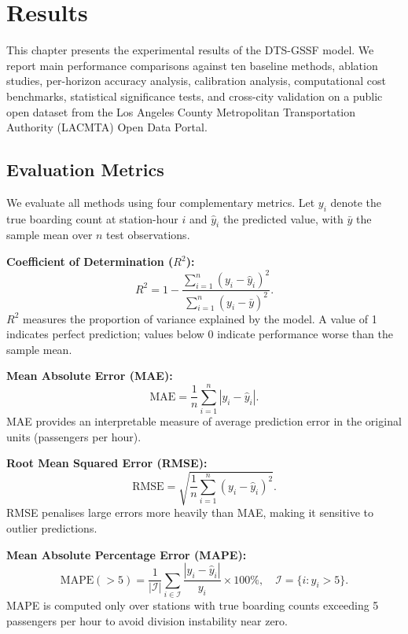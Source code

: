%
%
\chapter{Results}
\label{chap:results}
\setlength{\parskip}{1em}

This chapter presents the experimental results of the DTS-GSSF model. We report main performance comparisons against ten baseline methods, ablation studies, per-horizon accuracy analysis, calibration analysis, computational cost benchmarks, statistical significance tests, and cross-city validation on a public open dataset from the Los Angeles County Metropolitan Transportation Authority (LACMTA) Open Data Portal.

\section{Evaluation Metrics}
\label{sec:metrics}

We evaluate all methods using four complementary metrics. Let $y_i$ denote the true boarding count at station-hour $i$ and $\hat{y}_i$ the predicted value, with $\bar{y}$ the sample mean over $n$ test observations.

\textbf{Coefficient of Determination ($R^2$):}
\begin{equation}
    R^2 = 1 - \frac{\sum_{i=1}^{n}(y_i - \hat{y}_i)^2}{\sum_{i=1}^{n}(y_i - \bar{y})^2}.
    \label{eq:r2}
\end{equation}
$R^2$ measures the proportion of variance explained by the model. A value of 1 indicates perfect prediction; values below 0 indicate performance worse than the sample mean.

\textbf{Mean Absolute Error (MAE):}
\begin{equation}
    \text{MAE} = \frac{1}{n}\sum_{i=1}^{n}|y_i - \hat{y}_i|.
    \label{eq:mae}
\end{equation}
MAE provides an interpretable measure of average prediction error in the original units (passengers per hour).

\textbf{Root Mean Squared Error (RMSE):}
\begin{equation}
    \text{RMSE} = \sqrt{\frac{1}{n}\sum_{i=1}^{n}(y_i - \hat{y}_i)^2}.
    \label{eq:rmse}
\end{equation}
RMSE penalises large errors more heavily than MAE, making it sensitive to outlier predictions.

\textbf{Mean Absolute Percentage Error (MAPE):}
\begin{equation}
    \text{MAPE}(>5) = \frac{1}{|\mathcal{I}|}\sum_{i \in \mathcal{I}}\frac{|y_i - \hat{y}_i|}{y_i} \times 100\%, \quad \mathcal{I} = \{i : y_i > 5\}.
    \label{eq:mape}
\end{equation}
MAPE is computed only over stations with true boarding counts exceeding 5 passengers per hour to avoid division instability near zero.

